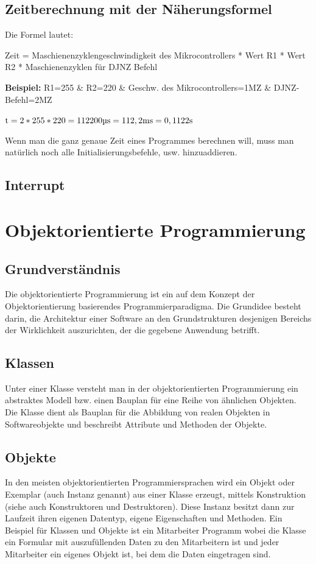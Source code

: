 \documentclass[12pt,a4paper]{article}
\begin{document}
\subsection{Zeitberechnung mit der Näherungsformel}
    Die Formel lautet:
    \begin{center}
        Zeit = Maschienenzyklengeschwindigkeit des Mikrocontrollers * Wert R1 * Wert R2 * Maschienenzyklen für DJNZ Befehl
    \end{center}
    \textbf{Beispiel:}\newline
    R1=255 \& R2=220 \& Geschw. des Mikrocontrollers=1MZ \& DJNZ-Befehl=2MZ\newline
    \begin{center}
        $\text{t} = 2*255*220 = 112200\text{\textmu s} = 112,2\text{ms} = 0,1122\text{s}$    
    \end{center}
    Wenn man die ganz genaue Zeit eines Programmes berechnen will, muss man natürlich noch alle Initialisierungsbefehle, usw. hinzuaddieren.
    
\subsection{Interrupt}

\section{Objektorientierte Programmierung}

\subsection{Grundverständnis}
    Die objektorientierte Programmierung ist ein auf dem Konzept der Objektorientierung basierendes
    Programmierparadigma. Die Grundidee besteht darin, die Architektur einer Software an den Grundstrukturen desjenigen
    Bereichs der Wirklichkeit auszurichten, der die gegebene Anwendung betrifft.

\subsection{Klassen}
    Unter einer Klasse versteht man in der objektorientierten Programmierung ein abstraktes Modell bzw. einen Bauplan für eine Reihe von ähnlichen Objekten. Die Klasse dient als Bauplan für die Abbildung von realen Objekten in Softwareobjekte und beschreibt Attribute und Methoden der Objekte.

\subsection{Objekte}
    In den meisten objektorientierten Programmiersprachen wird ein Objekt oder Exemplar (auch Instanz genannt) aus einer Klasse erzeugt, mittels Konstruktion (siehe auch Konstruktoren und Destruktoren). Diese Instanz besitzt dann zur Laufzeit ihren eigenen Datentyp, eigene Eigenschaften und Methoden. Ein Beispiel für Klassen und Objekte ist ein Mitarbeiter Programm wobei die Klasse ein Formular mit auszufüllenden Daten zu den Mitarbeitern ist und jeder Mitarbeiter ein eigenes Objekt ist, bei dem die Daten eingetragen sind.
\end{document}
